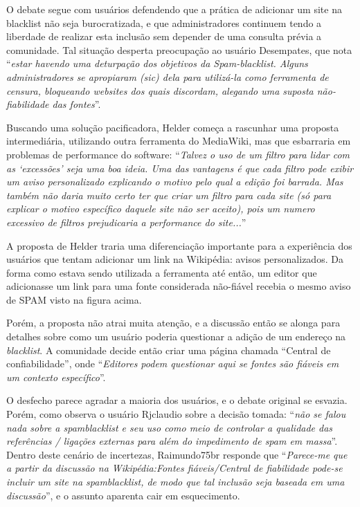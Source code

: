 O debate segue com usuários defendendo que a prática de adicionar um site na blacklist não seja burocratizada, e que administradores continuem tendo a liberdade de realizar esta inclusão sem depender de uma consulta prévia a comunidade. Tal situação desperta preocupação ao usuário Desempates, que nota ``\textit{estar havendo uma deturpação dos objetivos da Spam-blacklist. Alguns administradores se apropiaram (sic) dela para utilizá-la como ferramenta de censura, bloqueando websites dos quais discordam, alegando uma suposta não-fiabilidade das fontes}''.

Buscando uma solução pacificadora, Helder começa a rascunhar uma proposta intermediária, utilizando outra ferramenta do MediaWiki, mas que esbarraria em problemas de performance do software: ``\textit{Talvez o uso de um filtro para lidar com as  ‘excessões’ seja uma boa ideia. Uma das vantagens é que cada filtro pode exibir um aviso personalizado explicando o motivo pelo qual a edição foi barrada. Mas também não daria muito certo ter que criar um filtro para cada site (só para explicar o motivo específico daquele site não ser aceito), pois um numero excessivo de filtros prejudicaria a performance do site...}''

A proposta de Helder traria uma diferenciação importante para a experiência dos usuários que tentam adicionar um link na Wikipédia: avisos personalizados. Da forma como estava sendo utilizada a ferramenta até então, um editor que adicionasse um link para uma fonte considerada não-fiável recebia o mesmo aviso de SPAM visto na figura acima.

Porém, a proposta não atrai muita atenção, e a discussão então se alonga para detalhes sobre como um usuário poderia questionar a adição de um endereço na \textit{blacklist}. A comunidade decide então criar uma página chamada ``Central de confiabilidade'', onde ``\textit{Editores podem questionar aqui se fontes são fiáveis em um contexto específico}''. 

O desfecho parece agradar a maioria dos usuários, e o debate original se esvazia. Porém, como observa o usuário Rjclaudio sobre a decisão tomada: ``\textit{não se falou nada sobre a spamblacklist e seu uso como meio de controlar a qualidade das referências / ligações externas para além do impedimento de spam em massa}''. Dentro deste cenário de incertezas, Raimundo75br responde que ``\textit{Parece-me que a partir da discussão na Wikipédia:Fontes fiáveis/Central de fiabilidade pode-se incluir um site na spamblacklist, de modo que tal inclusão seja baseada em uma discussão}'', e o assunto aparenta cair em esquecimento.

